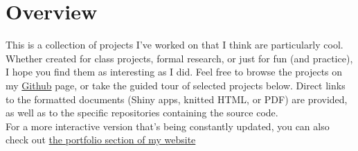 \documentclass[letterpaper]{deedy-resume} %
\begin{document}



\section{Overview}
\begin{flushleft}
This is a collection of projects I've worked on that I think are
particularly cool. Whether created for class projects, formal
research, or just for fun (and practice), I hope you find them as
interesting as I did. Feel free to browse the projects on my
\href{http://www.github.com/raffled/}{Github} page, or take the guided tour
of selected projects below. Direct links to the formatted documents
(Shiny apps, knitted HTML, or PDF) are provided, as well as to the
specific repositories containing the source code.\\

For a more interactive version that's being constantly updated, you
can also check out 
\href{http://stat.wvu.edu/~draffle/portfolio}{the portfolio section of my website}
\end{flushleft}
\end{document}
